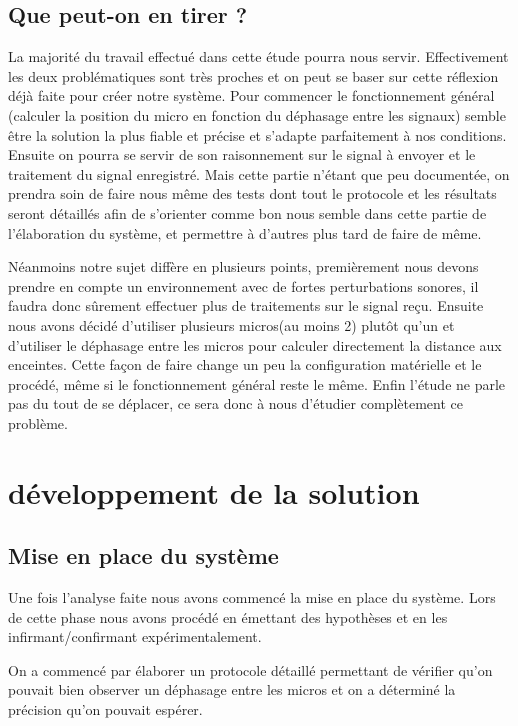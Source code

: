 \documentclass[12pt,a4paper]{report}
\begin{document}
\section{Que peut-on en tirer ?}

La majorité du travail effectué dans cette étude pourra nous servir. Effectivement les  deux problématiques sont très proches et on peut se baser sur cette réflexion déjà faite pour créer notre système.
Pour commencer le fonctionnement général (calculer la position du micro en fonction du déphasage entre les signaux) semble être la solution la plus fiable et précise et s'adapte parfaitement à nos conditions.
Ensuite on pourra se servir de son raisonnement sur le signal à envoyer et le traitement du signal enregistré. Mais cette partie n'étant que peu documentée, on prendra soin de faire nous même des tests dont tout le protocole et les résultats seront détaillés afin de s'orienter comme bon nous semble dans cette partie de l'élaboration du système, et permettre à d'autres plus tard de faire de même.

Néanmoins notre sujet diffère en plusieurs points, premièrement nous devons prendre en compte un environnement avec de fortes perturbations sonores, il faudra donc sûrement effectuer plus de traitements sur le signal reçu. Ensuite nous avons décidé d'utiliser plusieurs micros(au moins 2) plutôt qu'un et d'utiliser le déphasage entre les micros pour calculer directement la distance aux enceintes. Cette façon de faire change un peu la configuration matérielle et le procédé, même si le fonctionnement général reste le même. Enfin l'étude ne parle pas du tout de se déplacer, ce sera donc à nous d'étudier complètement ce problème.


\chapter{développement de la solution}
\section{Mise en place du système}

Une fois l'analyse faite nous avons commencé la mise en place du système.
Lors de cette phase nous avons procédé en émettant des hypothèses et en les infirmant/confirmant expérimentalement. 


On a commencé par élaborer un protocole détaillé permettant de vérifier qu'on pouvait bien observer un déphasage entre les micros et on a déterminé la précision qu'on pouvait espérer.
\end{document}
